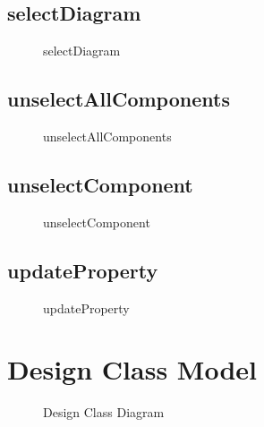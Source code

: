 \documentclass[12pt]{article}
\begin{document}

    \subsection{selectDiagram}
    \begin{figure}[H]
        \centering
        
        \caption{selectDiagram}
    \end{figure}


    \subsection{unselectAllComponents}
    \begin{figure}[H]
        \centering
        
        \caption{unselectAllComponents}
    \end{figure}


    \subsection{unselectComponent}
    \begin{figure}[H]
        \centering
        
        \caption{unselectComponent}
    \end{figure}


    \subsection{updateProperty}
    \begin{figure}[H]
        \centering
        
        \caption{updateProperty}
    \end{figure}


    \section{Design Class Model}

    \begin{figure}[H]
        \centering
        
        \caption{Design Class Diagram}
    \end{figure}
\end{document}
